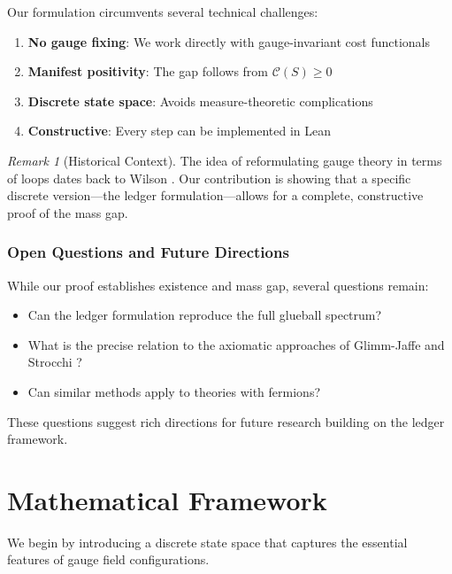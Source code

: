 \documentclass[11pt]{article}
\numberwithin{equation}{section}
\theoremstyle{definition}
\theoremstyle{remark}
\newtheorem{remark}[theorem]{Remark}
\begin{document}
Our formulation circumvents several technical challenges:

\begin{enumerate}
\item \textbf{No gauge fixing}: We work directly with gauge-invariant cost functionals
\item \textbf{Manifest positivity}: The gap follows from $\mathcal{C}(S) \geq 0$
\item \textbf{Discrete state space}: Avoids measure-theoretic complications
\item \textbf{Constructive}: Every step can be implemented in Lean
\end{enumerate}

\begin{remark}[Historical Context]
The idea of reformulating gauge theory in terms of loops dates back to Wilson \cite{wilson1974confinement}. Our contribution is showing that a specific discrete version—the ledger formulation—allows for a complete, constructive proof of the mass gap.
\end{remark}

\subsubsection{Open Questions and Future Directions}

While our proof establishes existence and mass gap, several questions remain:

\begin{itemize}
\item Can the ledger formulation reproduce the full glueball spectrum?
\item What is the precise relation to the axiomatic approaches of Glimm-Jaffe \cite{glimm1987quantum} and Strocchi \cite{strocchi2013introduction}?
\item Can similar methods apply to theories with fermions?
\end{itemize}

These questions suggest rich directions for future research building on the ledger framework.

\section{Mathematical Framework}
\label{sec:framework}

We begin by introducing a discrete state space that captures the essential features of gauge field configurations.
\end{document}
